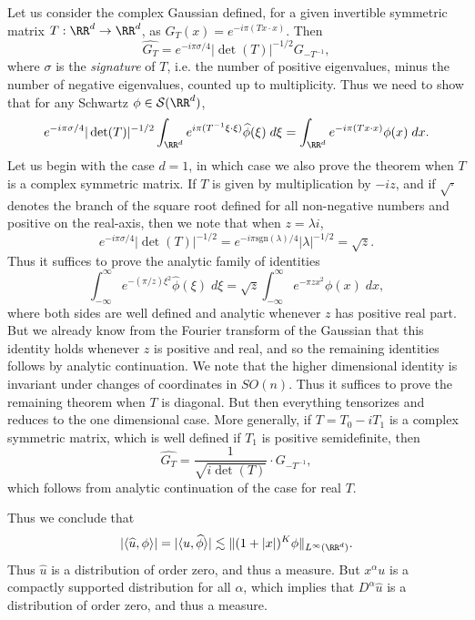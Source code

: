 \begin{example}
  Let us consider the complex Gaussian defined, for a given invertible symmetric matrix $T: \RR^d \to \RR^d$, as $G_T(x) = e^{- i \pi (Tx \cdot x)}$. Then
  \[ \widehat{G_T} = e^{- i \pi \sigma/4} |\det(T)|^{-1/2} G_{-T^{-1}}, \]
  where $\sigma$ is the \emph{signature} of $T$, i.e. the number of positive eigenvalues, minus the number of negative eigenvalues, counted up to multiplicity. Thus we need to show that for any Schwartz $\phi \in \mathcal{S}(\RR^d)$,
  \[ e^{-i \pi \sigma/4} |\det(T)|^{-1/2} \int_{\RR^d} e^{i \pi (T^{-1}\xi \cdot \xi)} \widehat{\phi}(\xi)\; d\xi = \int_{\RR^d} e^{- i \pi (Tx \cdot x)} \phi(x)\; dx. \]
  Let us begin with the case $d = 1$, in which case we also prove the theorem when $T$ is a complex symmetric matrix. If $T$ is given by multiplication by $-iz$, and if $\sqrt{\cdot}$ denotes the branch of the square root defined for all non-negative numbers and positive on the real-axis, then we note that when $z = \lambda i$,
  \[ e^{- i \pi \sigma/4} |\det(T)|^{-1/2} = e^{- i \pi \text{sgn}(\lambda)/4} |\lambda|^{-1/2} = \sqrt{z}. \]
  Thus it suffices to prove the analytic family of identities
  \[ \int_{-\infty}^\infty e^{- (\pi/z) \xi^2} \widehat{\phi}(\xi)\; d\xi = \sqrt{z} \int_{-\infty}^\infty e^{-\pi z x^2} \phi(x)\; dx, \]
  where both sides are well defined and analytic whenever $z$ has positive real part. But we already know from the Fourier transform of the Gaussian that this identity holds whenever $z$ is positive and real, and so the remaining identities follows by analytic continuation. We note that the higher dimensional identity is invariant under changes of coordinates in $SO(n)$. Thus it suffices to prove the remaining theorem when $T$ is diagonal. But then everything tensorizes and reduces to the one dimensional case. More generally, if $T = T_0 - i T_1$ is a complex symmetric matrix, which is well defined if $T_1$ is positive semidefinite, then
  \[ \widehat{G_T} = \frac{1}{\sqrt{i \det(T)}} \cdot G_{-T^{-1}}, \]
  which follows from analytic continuation of the case for real $T$.
\end{example}

Thus we conclude that
%
\[ |\langle \widehat{u}, \phi \rangle| = |\langle u, \widehat{\phi} \rangle| \lesssim \| (1 + |x|)^K \phi \|_{L^\infty(\RR^d)}. \]
%
Thus $\widehat{u}$ is a distribution of order zero, and thus a measure. But $x^\alpha u$ is a compactly supported distribution for all $\alpha$, which implies that $D^\alpha \widehat{u}$ is a distribution of order zero, and thus a measure. 

